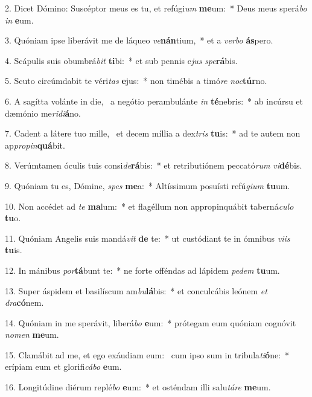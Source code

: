 2. Dicet Dómino: Suscéptor meus es tu, et refúgi\textit{um} \textbf{me}um:~*  Deus meus sperá\textit{bo} \textit{in} \textbf{e}um.\

3. Quóniam ipse liberávit me de láqueo \textit{ve}\textbf{nán}tium,~*  et a \textit{ver}\textit{bo} \textbf{ás}pero.\

4. Scápulis suis obumbrá\textit{bit} \textbf{ti}bi:~*  et sub pennis e\textit{jus} \textit{spe}\textbf{rá}bis.\

5. Scuto circúmdabit te véri\textit{tas} \textbf{e}jus:~*  non timébis a timó\textit{re} \textit{noc}\textbf{túr}no.\

6. A sagítta volánte in die, \dag\  a negótio perambulánte \textit{in} \textbf{té}nebris:~*  ab incúrsu et dæmónio me\textit{ri}\textit{di}\textbf{á}no.\

7. Cadent a látere tuo mille, \dag\  et decem míllia a dex\textit{tris} \textbf{tu}is:~*  ad te autem non ap\textit{pro}\textit{pin}\textbf{quá}bit.\

8. Verúmtamen óculis tuis consi\textit{de}\textbf{rá}bis:~*  et retributiónem peccató\textit{rum} \textit{vi}\textbf{dé}bis.\

9. Quóniam tu es, Dómine, \textit{spes} \textbf{me}a:~*  Altíssimum posuísti refú\textit{gi}\textit{um} \textbf{tu}um.\

10. Non accédet ad \textit{te} \textbf{ma}lum:~*  et flagéllum non appropinquábit taberná\textit{cu}\textit{lo} \textbf{tu}o.\

11. Quóniam Angelis suis mandá\textit{vit} \textbf{de} te:~*  ut custódiant te in ómnibus \textit{vi}\textit{is} \textbf{tu}is.\

12. In mánibus \textit{por}\textbf{tá}bunt te:~*  ne forte offéndas ad lápidem \textit{pe}\textit{dem} \textbf{tu}um.\

13. Super áspidem et basilíscum am\textit{bu}\textbf{lá}bis:~*  et conculcábis leónem \textit{et} \textit{dra}\textbf{có}nem.\

14. Quóniam in me sperávit, liberá\textit{bo} \textbf{e}um:~*  prótegam eum quóniam cognóvit \textit{no}\textit{men} \textbf{me}um.\

15. Clamábit ad me, et ego exáudiam eum: \dag\  cum ipso sum in tribula\textit{ti}\textbf{ó}ne:~*  erípiam eum et glorifi\textit{cá}\textit{bo} \textbf{e}um.\

16. Longitúdine diérum replé\textit{bo} \textbf{e}um:~*  et osténdam illi salu\textit{tá}\textit{re} \textbf{me}um.\

